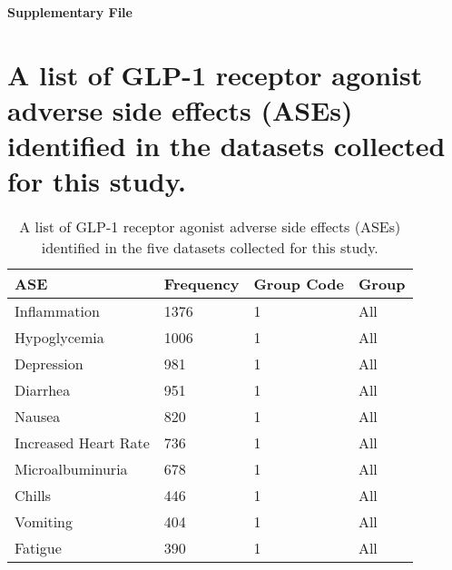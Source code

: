 \documentclass[referee,bst/sn-basic]{sn-jnl}%
\theoremstyle{thmstyletwo}%
\theoremstyle{thmstylethree}%
\begin{document}
\newpage
\begin{appendices}

\textbf{Supplementary File}

\section{
A list of GLP-1 receptor agonist adverse side effects (ASEs) identified in the datasets collected for this study.}
\label{app1:All_ASEs}

\begin{longtable}{llll}
\caption{A list of GLP-1 receptor agonist adverse side effects (ASEs) identified in the five datasets collected for this study.}
\\
\hline
ASE                                      & Frequency & Group Code & Group                  \\ \hline
\endhead
%
\hline
\endfoot
%
\endlastfoot
%
Inflammation                             & 1376      & 1    & All                     \\
Hypoglycemia                             & 1006      & 1    & All                     \\
Depression                               & 981       & 1    & All                     \\
Diarrhea                                 & 951       & 1    & All                     \\
Nausea                                   & 820       & 1    & All                     \\
Increased Heart Rate                     & 736       & 1    & All                     \\
Microalbuminuria                         & 678       & 1    & All                     \\
Chills                                   & 446       & 1    & All                     \\
Vomiting                                 & 404       & 1    & All                     \\
Fatigue                                  & 390       & 1    & All                     \\

\end{longtable}
\end{appendices}
\end{document}
